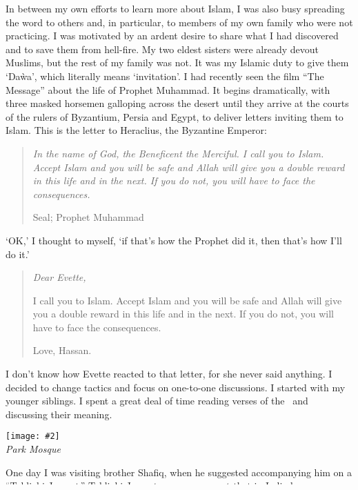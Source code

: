 \documentclass[12pt]{memoir}
\newcommand{\img}[3]{\begin{center}%
\texttt{[image: \#2]}\\{\small\em#3}%
\end{center}}
\begin{document}
In between my own efforts to learn more about Islam,
I was also busy spreading the word to others and, in particular,
to members of my own family who were not practicing.
I was motivated by an ardent desire to share what I had discovered
and to save them from hell-fire.
My two eldest sisters were already devout Muslims,
but the rest of my family was not.
It was my Islamic duty to give them ‘Da\`wa’,
which literally means ‘invitation’.
I had recently seen the film “The Message” about the life of Prophet Muhammad.
It begins dramatically, with three masked horsemen galloping across the desert
until they arrive at the courts of the rulers of Byzantium,
Persia and Egypt, to deliver letters inviting them to Islam.
This is the letter to Heraclius, the Byzantine Emperor:

\begin{quote}
\itshape
In the name of God, the Beneficent the Merciful.
I call you to Islam.
Accept Islam and you will be safe
and Allah will give you a double reward in this life and in the next.
If you do not, you will have to face the consequences.

Seal; Prophet Muhammad
\end{quote}

‘OK,’ I thought to myself, ‘if that’s how the Prophet did it,
then that’s how I’ll do it.’

\begin{quote}
\itshape
Dear Evette,

I call you to Islam. Accept Islam and you will be safe
and Allah will give you a double reward in this life and in the next.
If you do not, you will have to face the consequences.

Love, Hassan.
\end{quote}

I don’t know how Evette reacted to that letter, for she never said anything.
I decided to change tactics and focus on one-to-one discussions.
I started with my younger siblings.
I spent a great deal of time reading verses of the \Quran\
and discussing their meaning.

\img{scale=0.4}{Hassan_in_Regents_Park_Mosque.jpg}
{\cor{Regents}{Regent’s} Park Mosque}

One day I was visiting brother Shafiq,
when he suggested accompanying him on a “Tablighi Jamaat.”
Tablighi Jamaat was a movement that 
in India by Muhammad Kandhalawi who wanted to bring Muslims
back to the path of pure Islam.
They adhere to the Deobandi brand of Sunni Islam that is followed
in large parts of South East Asia
and has a huge following in Pakistan and India.
During the 80s the group had become very popular in the UK.
\end{document}
